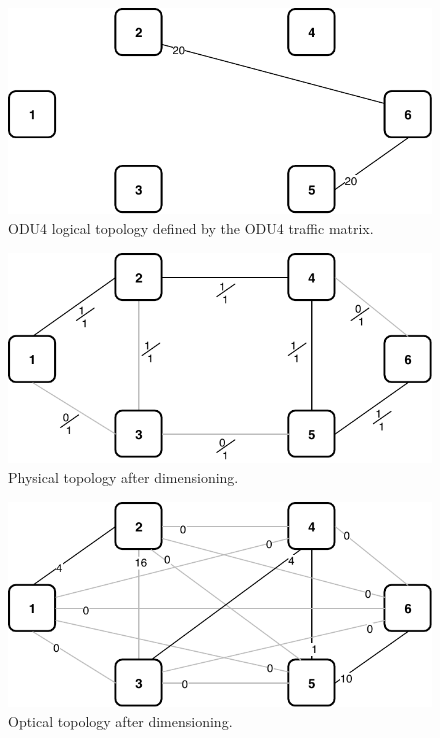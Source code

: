 \begin{figure}[h!]
\centering
\includegraphics[width=12cm]{sdf/ilp/translucent_survivability/figures/logical_topology_ODU4_high}
\caption{ODU4 logical topology defined by the ODU4 traffic matrix.}
\label{logical3_ODU4_high}
\end{figure}
\newpage
\begin{figure}[h!]
\centering
\includegraphics[width=13cm]{sdf/ilp/translucent_survivability/figures/physical_topology}
\caption{Physical topology after dimensioning.}
\label{physical3_high}
\end{figure}

\vspace{13pt}
\begin{figure}[h!]
\centering
\includegraphics[width=13cm]{sdf/ilp/translucent_survivability/figures/optical_topology_high}
\caption{Optical topology after dimensioning.}
\label{optical3_high}
\end{figure}


